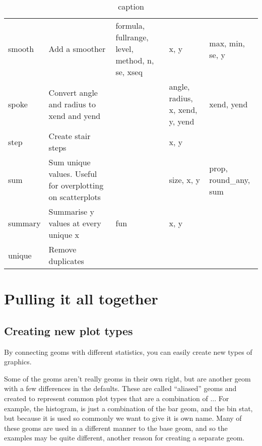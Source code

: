 \begin{table}
\begin{center}
\begin{tabular}{lp{1.5in}p{2in}p{1in}p{1.5in}}
    smooth       & Add a smoother                                              & formula, fullrange, level, method, n, se, xseq & x, y                            & max, min, se, y                      \\
    spoke        & Convert angle and radius to xend and yend                   &                                                & angle, radius, x, xend, y, yend & xend, yend                           \\
    step         & Create stair steps                                          &                                                & x, y                            &                                      \\
    sum          & Sum unique values.  Useful for overplotting on scatterplots &                                                & size, x, y                      & prop, round\_any, sum               \\
    summary      & Summarise y values at every unique x                        & fun                                            & x, y                            &                                      \\
    unique       & Remove duplicates                                           &                                                &                                 &                                      \\
    \bottomrule
  \end{tabular}
  \end{center}
  \caption{caption}
  \label{label}
\end{table}


\section{Pulling it all together}
\label{sec:pull-together}

\subsection{Creating new plot types}
\label{sub:new_plot_types}

By connecting geoms with different statistics, you can easily create new types of graphics.  

Some of the geoms aren't really geoms in their own right, but are another geom with a few differences in the defaults.  These are called ``aliased'' geoms and created to represent common plot types that are a combination of ...  For example, the histogram, is just a combination of the bar geom, and the bin stat, but because it is used so commonly we want to give it is own name. Many of these geoms are used in a different manner to the base geom, and so the examples may be quite different, another reason for creating a separate geom.

